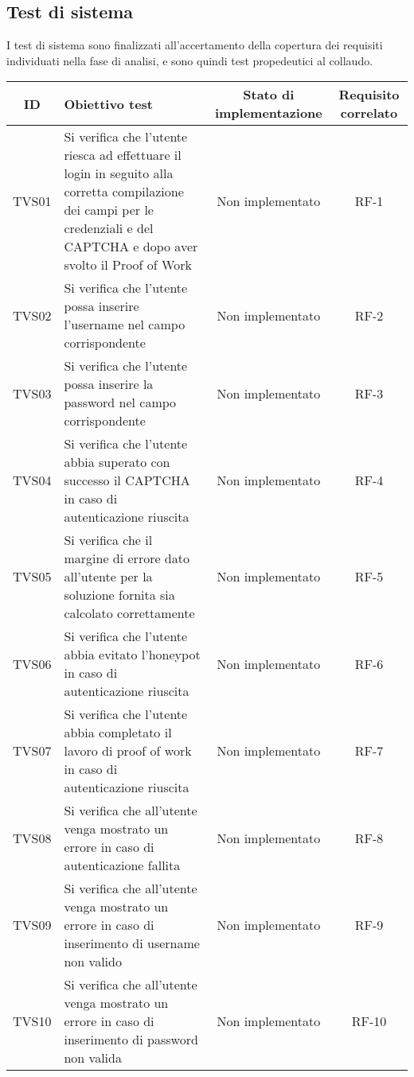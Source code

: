 \subsection{Test di sistema}
I test di sistema sono finalizzati all'accertamento della copertura dei requisiti individuati nella fase di analisi, e sono quindi test propedeutici al collaudo.
\newpage
\begin{center}
	\setlength\extrarowheight{5pt}
	\begin{xltabular}{\textwidth}{|c|X|c|c|}
		\hline
		\textbf{ID} & \textbf{Obiettivo test} & \textbf{Stato di implementazione} & \textbf{Requisito correlato}\\
		\hline
		TVS01 & Si verifica che l’utente riesca ad effettuare
		il login in seguito alla corretta compilazione dei campi per le credenziali e del CAPTCHA e dopo aver svolto il Proof of Work & Non implementato & RF-1\\
		\hline
		TVS02 & Si verifica che l'utente possa inserire l'username nel campo corrispondente & Non implementato & RF-2\\
		\hline
		TVS03 & Si verifica che l'utente possa inserire la password nel campo corrispondente & Non implementato & RF-3\\
		\hline
		TVS04 & Si verifica che l'utente abbia superato con successo il CAPTCHA in caso di autenticazione riuscita & Non implementato & RF-4\\
		\hline
		TVS05 & Si verifica che il margine di errore dato all'utente per la soluzione fornita sia calcolato correttamente & Non implementato & RF-5\\
		\hline
		TVS06 & Si verifica che l'utente abbia evitato l'honeypot in caso di  autenticazione riuscita & Non implementato & RF-6\\
		\hline
		TVS07 & Si verifica che l'utente abbia completato il lavoro di proof of work in caso di autenticazione riuscita & Non implementato & RF-7\\
		\hline
		TVS08 & Si verifica che all’utente venga mostrato un errore in caso di autenticazione fallita & Non implementato & RF-8\\
		\hline
		TVS09 & Si verifica che all’utente venga mostrato un errore in caso di inserimento di username non valido & Non implementato & RF-9\\
		\hline
		TVS10 & Si verifica che all’utente venga mostrato un errore in caso di inserimento di password non valida & Non implementato & RF-10\\

\end{xltabular}
\end{center}
